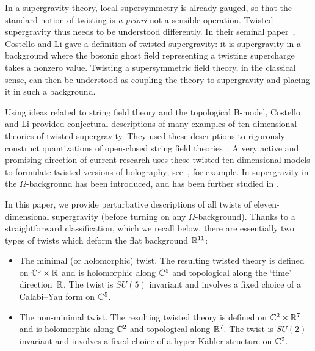In a supergravity theory, local supersymmetry is already gauged, so that the standard notion of twisting is {\em a priori} not a sensible operation. Twisted supergravity thus needs to be  understood differently.
In their seminal paper~\cite{CLsugra}, Costello and Li gave a definition of twisted supergravity: it is supergravity in a background where the bosonic ghost field representing a twisting supercharge takes a nonzero value.
Twisting a supersymmetric field theory, in the classical sense, can then be  understood as coupling the theory to supergravity and placing it in such a background.

Using ideas related to string field theory and the topological B-model, Costello and Li provided conjectural descriptions of many examples of ten-dimensional theories of twisted supergravity. They used these descriptions to rigorously construct quantizations of open-closed string field theories~\cite{CLbcov1,CLtypeI}. 
A very active and promising direction of current research uses these twisted ten-dimensional models to formulate twisted versions of holography; see~\cite{CostelloM2, Costello_2021, costello2021twisted, Ishtiaque_2020, budzik2021giant, Gaiotto:2020vqj}, for example.
In \cite{CostelloM5} supergravity in the $\Omega$-background has been introduced, and has been further studied in \cite{Gaiotto:2019wcc, Oh:2020hph, Oh:2021bwi}. 

In this paper, we provide perturbative descriptions of all twists of eleven-dimensional supergravity (before turning on any $\Omega$-background).
Thanks to a straightforward classification, which we recall below, there are essentially two types of twists which deform the flat background $\mathbb R^{11}$: 
\begin{itemize}
\item The minimal (or holomorphic) twist. 
The resulting twisted theory is defined on $\mathbb C^5 \times \mathbb R$ and is holomorphic along $\mathbb C^5$ and topological along the `time' direction~$\mathbb R$. 
The twist is $SU(5)$ invariant and involves a fixed choice of a Calabi--Yau form on $\mathbb C^5$. 
\item The non-minimal twist. 
The resulting twisted theory is defined on $\mathbb C^2 \times \mathbb R^7$ and is holomorphic along $\mathbb C^2$ and topological along $\mathbb R^7$.
The twist is $SU(2)$ invariant and involves a fixed choice of a hyper K\"ahler structure on $\mathbb C^2$.  
\end{itemize}

